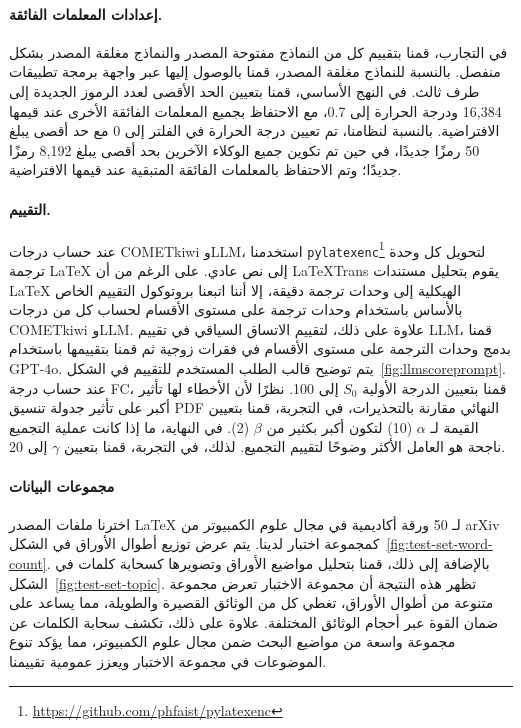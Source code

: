 \documentclass[11pt]{article}
\begin{document}
\paragraph{إعدادات المعلمات الفائقة.}
في التجارب، قمنا بتقييم كل من النماذج مفتوحة المصدر والنماذج مغلقة المصدر بشكل منفصل. بالنسبة للنماذج مغلقة المصدر، قمنا بالوصول إليها عبر واجهة برمجة تطبيقات طرف ثالث. في النهج الأساسي، قمنا بتعيين الحد الأقصى لعدد الرموز الجديدة إلى 16,384 ودرجة الحرارة إلى 0.7، مع الاحتفاظ بجميع المعلمات الفائقة الأخرى عند قيمها الافتراضية. بالنسبة لنظامنا، تم تعيين درجة الحرارة في الفلتر إلى 0 مع حد أقصى يبلغ 50 رمزًا جديدًا، في حين تم تكوين جميع الوكلاء الآخرين بحد أقصى يبلغ 8,192 رمزًا جديدًا؛ وتم الاحتفاظ بالمعلمات الفائقة المتبقية عند قيمها الافتراضية.

\paragraph{التقييم.}
عند حساب درجات COMETkiwi وLLM، استخدمنا \texttt{pylatexenc}\footnote{\url{https://github.com/phfaist/pylatexenc}} لتحويل كل وحدة ترجمة LaTeX إلى نص عادي. على الرغم من أن LaTeXTrans يقوم بتحليل مستندات LaTeX الهيكلية إلى وحدات ترجمة دقيقة، إلا أننا اتبعنا بروتوكول التقييم الخاص بالأساس باستخدام وحدات ترجمة على مستوى الأقسام لحساب كل من درجات COMETkiwi وLLM. علاوة على ذلك، لتقييم الاتساق السياقي في تقييم LLM، قمنا بدمج وحدات الترجمة على مستوى الأقسام في فقرات زوجية ثم قمنا بتقييمها باستخدام GPT-4o. يتم توضيح قالب الطلب المستخدم للتقييم في الشكل~\ref{fig:llmscoreprompt}. عند حساب درجة FC، قمنا بتعيين الدرجة الأولية $S_0$ إلى 100. نظرًا لأن الأخطاء لها تأثير أكبر على تأثير جدولة تنسيق PDF النهائي مقارنة بالتحذيرات، في التجربة، قمنا بتعيين القيمة لـ $\alpha$ (10) لتكون أكبر بكثير من $\beta$ (2). في النهاية، ما إذا كانت عملية التجميع ناجحة هو العامل الأكثر وضوحًا لتقييم التجميع. لذلك، في التجربة، قمنا بتعيين $\gamma$ إلى 20.

\paragraph{مجموعات البيانات}
اخترنا ملفات المصدر LaTeX لـ 50 ورقة أكاديمية في مجال علوم الكمبيوتر من arXiv كمجموعة اختبار لدينا. يتم عرض توزيع أطوال الأوراق في الشكل~\ref{fig:test-set-word-count}. بالإضافة إلى ذلك، قمنا بتحليل مواضيع الأوراق وتصويرها كسحابة كلمات في الشكل~\ref{fig:test-set-topic}. تظهر هذه النتيجة أن مجموعة الاختبار تعرض مجموعة متنوعة من أطوال الأوراق، تغطي كل من الوثائق القصيرة والطويلة، مما يساعد على ضمان القوة عبر أحجام الوثائق المختلفة. علاوة على ذلك، تكشف سحابة الكلمات عن مجموعة واسعة من مواضيع البحث ضمن مجال علوم الكمبيوتر، مما يؤكد تنوع الموضوعات في مجموعة الاختبار ويعزز عمومية تقييمنا.
\end{document}
